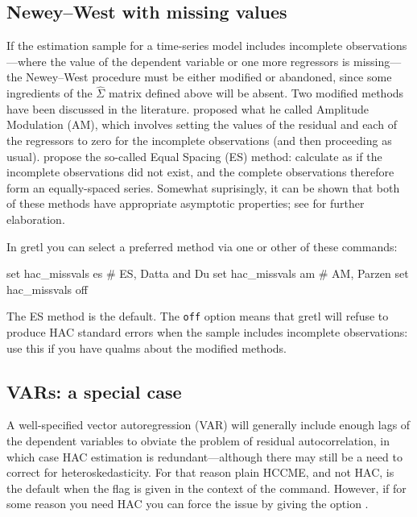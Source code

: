 \subsection{Newey--West with missing values}
\label{sec:has-missvals}

If the estimation sample for a time-series model includes incomplete
observations---where the value of the dependent variable or one more
regressors is missing---the Newey--West procedure must be either
modified or abandoned, since some ingredients of the $\hat{\Sigma}$
matrix defined above will be absent. Two modified methods have been
discussed in the literature. \cite{parzen63} proposed what he called
Amplitude Modulation (AM), which involves setting the values of the
residual and each of the regressors to zero for the incomplete
observations (and then proceeding as usual). \cite{datta-du12} propose
the so-called Equal Spacing (ES) method: calculate as if the incomplete
observations did not exist, and the complete observations therefore
form an equally-spaced series. Somewhat suprisingly, it can be shown
that both of these methods have appropriate asymptotic properties;
see \cite{rho-vogelsang18} for further elaboration.

In gretl you can select a preferred method via one or other of these
commands:
%
\begin{code}
set hac_missvals es # ES, Datta and Du
set hac_missvals am # AM, Parzen
set hac_missvals off
\end{code}
%
The ES method is the default. The \texttt{off} option means that gretl
will refuse to produce HAC standard errors when the sample includes
incomplete observations: use this if you have qualms about the
modified methods.

\subsection{VARs: a special case}
\label{sec:hac-VARs}

A well-specified vector autoregression (VAR) will generally include
enough lags of the dependent variables to obviate the problem of
residual autocorrelation, in which case HAC estimation is
redundant---although there may still be a need to correct for
heteroskedasticity. For that reason plain HCCME, and not HAC, is the
default when the  flag is given in the context of the
 command. However, if for some reason you need HAC you can
force the issue by giving the option .

